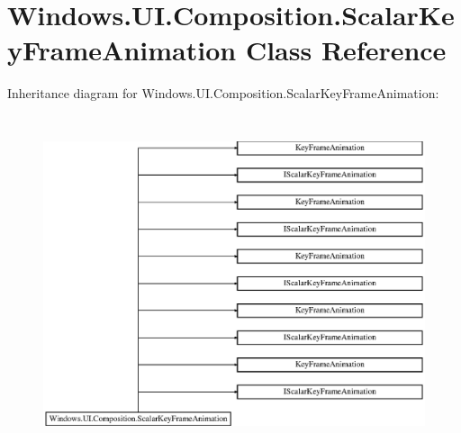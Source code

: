 \hypertarget{class_windows_1_1_u_i_1_1_composition_1_1_scalar_key_frame_animation}{}\section{Windows.\+U\+I.\+Composition.\+Scalar\+Key\+Frame\+Animation Class Reference}
\label{class_windows_1_1_u_i_1_1_composition_1_1_scalar_key_frame_animation}
Inheritance diagram for Windows.\+U\+I.\+Composition.\+Scalar\+Key\+Frame\+Animation\+:\begin{figure}[H]
\begin{center}
\leavevmode
\includegraphics[height=9.903537cm]{class_windows_1_1_u_i_1_1_composition_1_1_scalar_key_frame_animation}
\end{center}
\end{figure}
